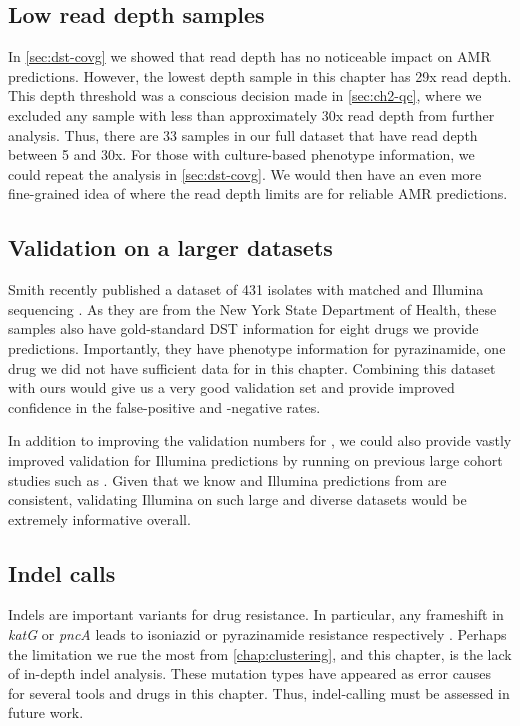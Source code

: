 \subsection{Low read depth samples}

In \autoref{sec:dst-covg} we showed that read depth has no noticeable impact on AMR predictions. However, the lowest depth sample in this chapter has 29x read depth. This depth threshold was a conscious decision made in \autoref{sec:ch2-qc}, where we excluded any sample with less than approximately 30x read depth from further analysis. Thus, there are 33 samples in our full dataset that have \ont{} read depth between 5 and 30x. For those with culture-based phenotype information, we could repeat the analysis in \autoref{sec:dst-covg}. We would then have an even more fine-grained idea of where the \ont{} read depth limits are for reliable AMR predictions.

\subsection{Validation on a larger datasets}

Smith \etal{} recently published a dataset of 431 \mtb{} isolates with matched \ont{} and Illumina sequencing \cite{smith2020}. As they are from the New York State Department of Health, these samples also have gold-standard DST information for eight drugs we provide predictions. Importantly, they have phenotype information for pyrazinamide, one drug we did not have sufficient data for in this chapter. Combining this dataset with ours would give us a very good \ont{} validation set and provide improved confidence in the false-positive and -negative rates. 

In addition to improving the validation numbers for \ont{}, we could also provide vastly improved validation for \drprg{} Illumina predictions by running on previous large cohort studies such as \cite{cryptic2018,hunt2019,phelan2019}. Given that we know \ont{} and Illumina predictions from \drprg{} are consistent, validating Illumina on such large and diverse datasets would be extremely informative overall.

\subsection{Indel calls}
\label{sec:indel-dst-fw}
Indels are important variants for \mtb{} drug resistance. In particular, any frameshift in \textit{katG} or \textit{pncA} leads to isoniazid or pyrazinamide resistance respectively \cite{miotto2017}. Perhaps the limitation we rue the most from \autoref{chap:clustering}, and this chapter, is the lack of in-depth indel analysis. These mutation types have appeared as error causes for several tools and drugs in this chapter. Thus, indel-calling must be assessed in future work.

